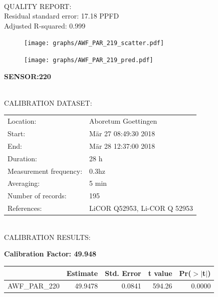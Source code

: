 \documentclass[oneside]{report}
\begin{document}
\hrulefill\\
QUALITY REPORT:\\
Residual standard error: 17.18 PPFD\\
Adjusted R-squared: 0.999



\begin{figure}[H]
  \centering
  \texttt{[image: graphs/AWF\_PAR\_219\_scatter.pdf]}
\end{figure}




\begin{figure}[H]
  \centering
  \texttt{[image: graphs/AWF\_PAR\_219\_pred.pdf]}
\end{figure}

\pagebreak


\begin{center}
\large{\textbf{SENSOR:220}}\\
\end{center}

\hrulefill\\
CALIBRATION DATASET:\\
\begin{table}[h!]
  \centering
  \label{tab:table1}
  \begin{tabular}{ll}
    Location: & Aboretum Goettingen\\ 
    
    
    Start:  & Mär 27 08:49:30 2018 \\
    End:   & Mär 28 12:37:00 2018\\ 
    Duration: & 28 h\\
    Measurement frequency: & 0.3hz\\
    Averaging:  &5 min\\
    Number of records: & 195 \\
    References: & LiCOR Q52953, Li-COR Q 52953 \\
  \end{tabular}
\end{table}

\hrulefill\\
CALIBRATION RESULTS:\\


\begin{center}
\textbf{\large{Calibration Factor: 49.948}}\\
\end{center}
\begin{table}[ht]
\centering
\begin{tabular}{rrrrr}
  \hline
 & Estimate & Std. Error & t value & Pr($>$$|$t$|$) \\ 
  \hline
AWF\_PAR\_220 & 49.9478 & 0.0841 & 594.26 & 0.0000 \\ 
   \hline
\end{tabular}
\end{table}
\end{document}

